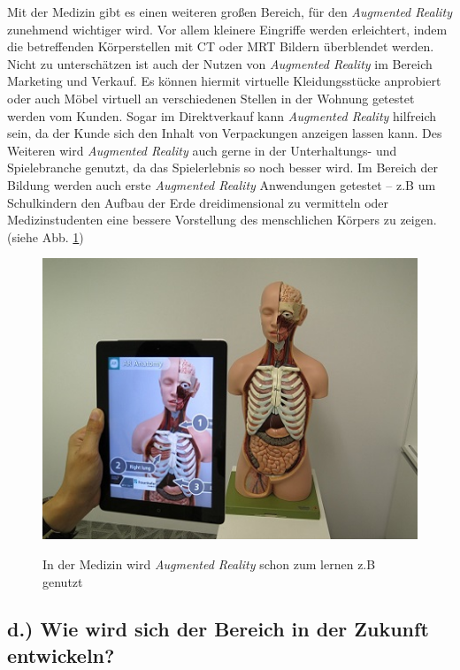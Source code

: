 \documentclass[12pt,utf8]{scrartcl}
\begin{document}
\begin{flushleft}
Mit der Medizin gibt es einen weiteren großen Bereich, für den \textit{Augmented Reality} zunehmend wichtiger wird. Vor allem kleinere Eingriffe werden erleichtert, indem die betreffenden Körperstellen mit CT oder MRT Bildern überblendet werden. Nicht zu unterschätzen ist auch der Nutzen von \textit{Augmented Reality} im Bereich Marketing und Verkauf. Es können hiermit virtuelle Kleidungsstücke anprobiert oder auch Möbel virtuell an verschiedenen Stellen in der Wohnung getestet werden vom Kunden. Sogar im Direktverkauf kann \textit{Augmented Reality} hilfreich sein, da der Kunde sich den Inhalt von Verpackungen anzeigen lassen kann. Des Weiteren wird \textit{Augmented Reality} auch gerne in der Unterhaltungs- und Spielebranche genutzt, da das Spielerlebnis so noch besser wird. Im Bereich der Bildung werden auch erste \textit{Augmented Reality} Anwendungen getestet – z.B um Schulkindern den Aufbau der Erde dreidimensional zu vermitteln oder Medizinstudenten eine bessere Vorstellung des menschlichen Körpers zu zeigen. (siehe Abb. \ref{fig:med})
\linebreak

\begin{figure}[H]
	\centering
	\includegraphics[width=0.8\linewidth]{images/medizin}
	\caption{In der Medizin wird \textit{Augmented Reality} schon zum lernen z.B genutzt} \cite{online3}
	\label{fig:med}
\end{figure}


\subsection*{\label{sub4:thema}d.) Wie wird sich der Bereich in der Zukunft entwickeln?}


\end{flushleft}
\end{document}
